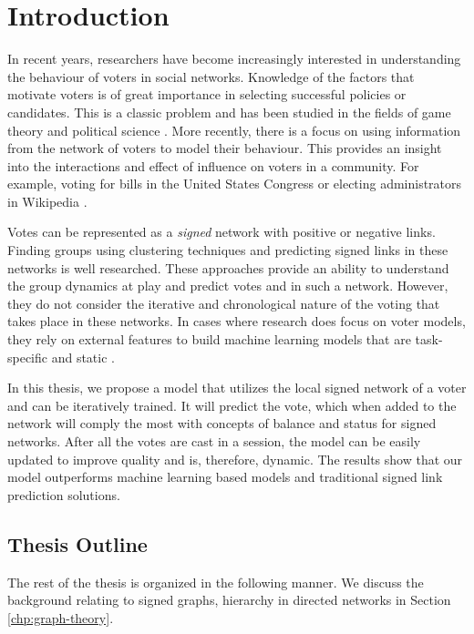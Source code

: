 \chapter{Introduction}



In recent years, researchers have become increasingly interested in understanding the behaviour of voters in social networks. Knowledge of the factors that motivate voters is of great importance in selecting successful policies or candidates. This is a classic problem and has been studied in the fields of game theory and political science \cite{zou2015strategicDoodle,kearns2009behavioral,tal2015a}. More recently, there is a focus on using information from the network of voters to model their behaviour. This provides an insight into the interactions and effect of influence on voters in a community. For example, voting for bills in the United States Congress \cite{karimi2019multicongress} or electing administrators in Wikipedia \cite{jankowski-lorek2013MBSN,cabunducan2011voting,lee2012uncovering}.

Votes can be represented as a \textit{signed} network with positive or negative links. Finding groups using clustering techniques \cite{brito2020aBrazil,levorato2016brazilian,chiang2014prediction} and predicting signed links \cite{leskovec2010predicting,leskovec2010signed,chiang2011exploiting} in these networks is well researched. These approaches provide an ability to understand the group dynamics at play and predict votes and in such a network. However, they do not consider the iterative and chronological nature of the voting that takes place in these networks. In cases where research does focus on voter models, they rely on external features to build machine learning models that are task-specific and static \cite{karimi2019multicongress,jankowski-lorek2013MBSN}.

In this thesis, we propose a model that utilizes the local signed network of a voter and can be iteratively trained. It will predict the vote, which when added to the network will comply the most with concepts of balance and status for signed networks. After all the votes are cast in a session, the model can be easily updated to improve quality and is, therefore, dynamic. 
The results show that our model outperforms machine learning based models and traditional signed link prediction solutions.   
\section{Thesis Outline}
The rest of the thesis is organized in the following manner. We discuss the background relating to signed graphs, hierarchy in directed networks in Section \ref{chp:graph-theory}.
